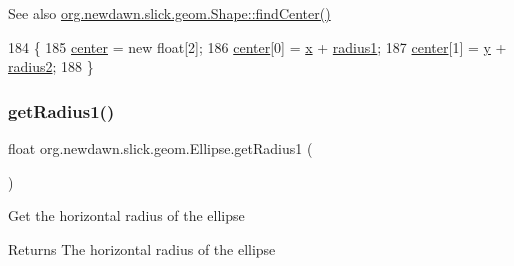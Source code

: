 \begin{DoxySeeAlso}{See also}
\mbox{\hyperlink{classorg_1_1newdawn_1_1slick_1_1geom_1_1_shape_ac90548bc552524c42ca2daad8e1ba692}{org.\+newdawn.\+slick.\+geom.\+Shape\+::find\+Center()}} 
\end{DoxySeeAlso}

\begin{DoxyCode}
184                                 \{
185         \mbox{\hyperlink{classorg_1_1newdawn_1_1slick_1_1geom_1_1_shape_a15ecde3336c4310cd927d766bb9a0b3b}{center}} = \textcolor{keyword}{new} \textcolor{keywordtype}{float}[2];
186         \mbox{\hyperlink{classorg_1_1newdawn_1_1slick_1_1geom_1_1_shape_a15ecde3336c4310cd927d766bb9a0b3b}{center}}[0] = \mbox{\hyperlink{classorg_1_1newdawn_1_1slick_1_1geom_1_1_shape_a3e985bfff386c15a4efaad03d8ad60d3}{x}} + \mbox{\hyperlink{classorg_1_1newdawn_1_1slick_1_1geom_1_1_ellipse_a26f6d13c3b22a475bc1caf33f84a24b9}{radius1}};
187         \mbox{\hyperlink{classorg_1_1newdawn_1_1slick_1_1geom_1_1_shape_a15ecde3336c4310cd927d766bb9a0b3b}{center}}[1] = \mbox{\hyperlink{classorg_1_1newdawn_1_1slick_1_1geom_1_1_shape_a9f934baded6a1b65ebb69e7e5f80ea00}{y}} + \mbox{\hyperlink{classorg_1_1newdawn_1_1slick_1_1geom_1_1_ellipse_ad3152cb17acd020ac3ae7bf70526ae9f}{radius2}};
188     \}
\end{DoxyCode}
\mbox{\label{classorg_1_1newdawn_1_1slick_1_1geom_1_1_ellipse_ae5df5130afe56c439dac29747119ca5a}} 
\subsubsection{\texorpdfstring{get\+Radius1()}{getRadius1()}}
{\footnotesize\ttfamily float org.\+newdawn.\+slick.\+geom.\+Ellipse.\+get\+Radius1 (\begin{DoxyParamCaption}{ }\end{DoxyParamCaption})\hspace{0.3cm}{\ttfamily [inline]}}

Get the horizontal radius of the ellipse

\begin{DoxyReturn}{Returns}
The horizontal radius of the ellipse 
\end{DoxyReturn}

